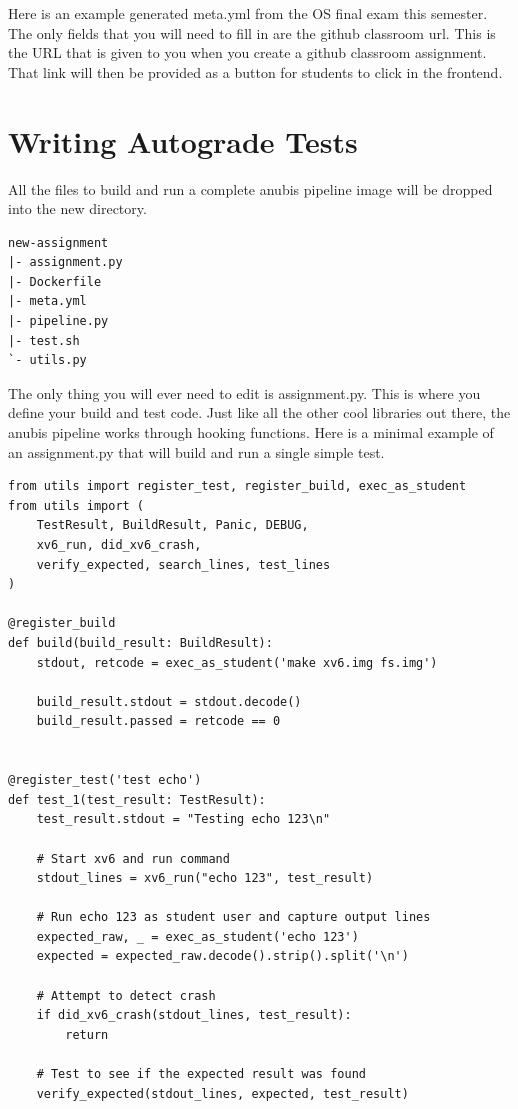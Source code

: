 Here is an example generated meta.yml from the OS final exam this semester.
The only fields that you will need to fill in are the github classroom url.
This is the URL that is given to you when you create a github classroom assignment.
That link will then be provided as a button for students to click in the frontend.


\section{Writing Autograde Tests}\label{sec:writing-autograde-tests}

All the files to build and run a complete anubis pipeline image will be dropped into the new directory.

\begin{verbatim}
new-assignment
|- assignment.py
|- Dockerfile
|- meta.yml
|- pipeline.py
|- test.sh
`- utils.py
\end{verbatim}

The only thing you will ever need to edit is assignment.py.
This is where you define your build and test code.
Just like all the other cool libraries out there, the anubis pipeline works
through hooking functions.
Here is a minimal example of an assignment.py that will build and run a single simple test.

\begin{verbatim}
from utils import register_test, register_build, exec_as_student
from utils import (
    TestResult, BuildResult, Panic, DEBUG,
    xv6_run, did_xv6_crash,
    verify_expected, search_lines, test_lines
)

@register_build
def build(build_result: BuildResult):
    stdout, retcode = exec_as_student('make xv6.img fs.img')

    build_result.stdout = stdout.decode()
    build_result.passed = retcode == 0


@register_test('test echo')
def test_1(test_result: TestResult):
    test_result.stdout = "Testing echo 123\n"

    # Start xv6 and run command
    stdout_lines = xv6_run("echo 123", test_result)

    # Run echo 123 as student user and capture output lines
    expected_raw, _ = exec_as_student('echo 123')
    expected = expected_raw.decode().strip().split('\n')

    # Attempt to detect crash
    if did_xv6_crash(stdout_lines, test_result):
        return

    # Test to see if the expected result was found
    verify_expected(stdout_lines, expected, test_result)
\end{verbatim}

